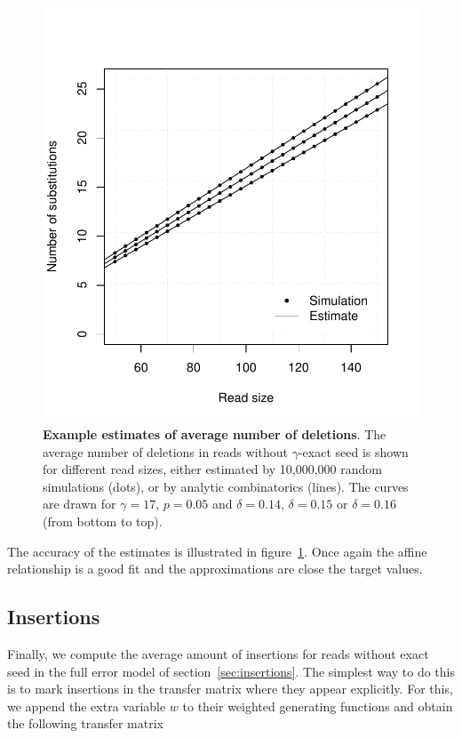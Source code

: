 \documentclass{article}
\begin{document}
\begin{figure}[h]
\centering
\includegraphics[scale=0.445]{simuldel-average2.pdf}
\caption{\textbf{Example estimates of average number of deletions}. The
average number of deletions in reads without $\gamma$-exact seed is
shown for different read sizes, either estimated by 10,000,000 random
simulations (dots), or by analytic combinatorics (lines). The curves are
drawn for $\gamma=17$, $p=0.05$ and $\delta=0.14$, $\delta=0.15$ or
$\delta=0.16$ (from bottom to top).}
\label{fig:simulavdel}
\end{figure}

The accuracy of the estimates is illustrated in
figure~\ref{fig:simulavdel}. Once again the affine relationship is a good
fit and the approximations are close the target values.





\subsection{Insertions}
\label{sec:avins}

Finally, we compute the average amount of insertions for reads without
exact seed in the full error model of section~\ref{sec:insertions}. The
simplest way to do this is to mark insertions in the transfer matrix where
they appear explicitly. For this, we append the extra variable $w$ to
their weighted generating functions and obtain the following transfer
matrix
\end{document}
